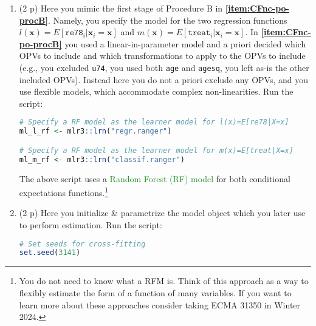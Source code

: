 \documentclass{article}
\begin{document}
\begin{enumerate}[label=\textbf{Q\arabic{enumi}}.,ref=Q\arabic{enumi}, wide=0pt, itemsep=0em, topsep=5pt, labelindent=0pt, resume]
\begin{enumerate}
\item (2 p) Here you mimic the first stage of Procedure B in \textbf{\ref{item:CFnc-po-procB}}. Namely, you specify the model for the two regression functions $l(\mathbf{x})=E[\texttt{re78}_i|\mathbf{x}_{i}=\mathbf{x}]$ and $m(\mathbf{x})=E[\texttt{treat}_i|\mathbf{x}_{i}=\mathbf{x}]$. In \textbf{\ref{item:CFnc-po-procB}} you used a linear-in-parameter model and a priori decided which OPVs to include and which transformations to apply to the OPVs to include (e.g., you excluded \texttt{u74}, you used both \texttt{age} and \texttt{agesq}, you left as-is the other included OPVs). Instead here you do not a priori exclude any OPVs, and you use flexible models, which accommodate complex non-linearities. Run the script:\label{item:dml-first-stage-models}
\begin{lstlisting}[language=R]
# Specify a RF model as the learner model for l(x)=E[re78|X=x]
ml_l_rf <- mlr3::lrn("regr.ranger")

# Specify a RF model as the learner model for m(x)=E[treat|X=x]
ml_m_rf <- mlr3::lrn("classif.ranger")
\end{lstlisting}
The above script uses a \textcolor{ForestGreen}{Random Forest (RF) model} for both conditional expectations functions.\footnote{You do not need to know what a RFM is. Think of this approach as a way to flexibly estimate the form of a function of many variables. If you want to learn more about these approaches consider taking ECMA 31350 in Winter 2024.}
\item (2 p) Here you initialize \& parametrize the model object which you later use to perform estimation. Run the script:
\begin{lstlisting}[language=R]
# Set seeds for cross-fitting
set.seed(3141)


\end{lstlisting}
\end{enumerate}
\end{enumerate}
\end{document}
